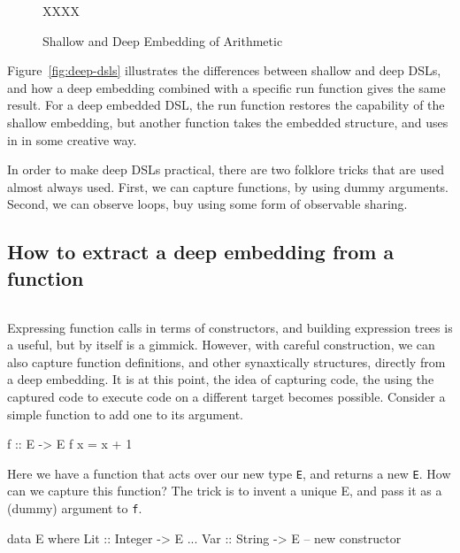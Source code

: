 \documentclass[11pt]{article}
\newcommand{\cursor}{%
\begin{center}
\marginpar{\vskip 4pt\sc Cursor}
\begin{tabular*}{\linewidth}{c}
\hline
\end{tabular*}
\end{center}
}
\begin{document}
\begin{figure}[!t]
  \centering
        XXXX
  \caption{Shallow and Deep Embedding of Arithmetic}
  \label{fig:counter-pictureX}
\end{figure}

Figure~\ref{fig:deep-dsls} illustrates the differences between shallow and deep DSLs,
and how a deep embedding combined with a specific run function gives the same result.
For a deep embedded DSL, the run function restores the capability of the shallow
embedding, but another function takes the embedded structure, and uses in in some creative way. 

In order to make deep DSLs practical, there are two folklore tricks that are used almost
always used.
First, we can capture functions, by using dummy arguments. Second, we can observe loops,
buy using some form of observable sharing. 

\subsection{How to extract a deep embedding from a function}

\cursor{}

Expressing function calls in terms of constructors,  and
building expression trees is a useful, but by itself is a gimmick. 
However, with careful construction, we can also capture function definitions,
and other synaxtically structures,
directly from a deep embedding. It is at this
point, the idea of capturing code,
the using the captured code to execute code
on a different target becomes possible.
Consider a simple function to add one to its argument.

\begin{Code}

f :: E -> E
f x = x + 1
        
\end{Code}

Here we have a function that acts over our new type
\verb|E|, and returns a new \verb|E|. How can we capture
this function?
The trick is to invent a unique E, and pass it as a (dummy) argument
to \verb|f|.

\begin{Code}
data E where
  Lit :: Integer -> E
  ...
  Var :: String -> E    -- new constructor
\end{Code}        
\end{document}
